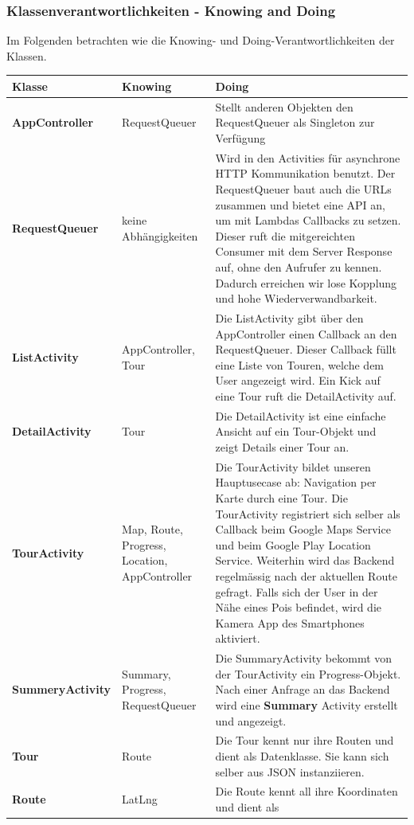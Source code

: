 \documentclass[a4paper,10pt,xetex]{article}
\begin{document}
\subsubsection{Klassenverantwortlichkeiten - Knowing and Doing}\label{knowinganddoing-frontend}
Im Folgenden betrachten wie die Knowing- und Doing-Verantwortlichkeiten der Klassen. 
\begin{longtabu} to \textwidth { | l | l | X[l] |  }
\hline
\textbf{Klasse} & \textbf{Knowing} & \textbf{Doing} \\\hline
\endhead
\textbf{AppController} & RequestQueuer & Stellt anderen Objekten den RequestQueuer 
als Singleton zur Verfügung\\\hline
\textbf{RequestQueuer} & keine Abhängigkeiten & Wird in den Activities für asynchrone
HTTP Kommunikation benutzt. Der RequestQueuer baut auch die URLs zusammen und bietet
eine API an, um mit Lambdas Callbacks zu setzen. Dieser ruft die mitgereichten 
Consumer mit dem Server Response auf, ohne den Aufrufer zu kennen. Dadurch erreichen
wir lose Kopplung und hohe Wiederverwandbarkeit. \\\hline
\textbf{ListActivity} & AppController, Tour & Die ListActivity gibt über den AppController
einen Callback an den RequestQueuer. Dieser Callback füllt eine Liste von Touren,
welche dem User angezeigt wird. Ein Kick auf eine Tour ruft die DetailActivity auf.
\\\hline
\textbf{DetailActivity} & Tour & Die DetailActivity ist eine einfache Ansicht auf 
ein Tour-Objekt und zeigt Details einer Tour an.\\\hline
\textbf{TourActivity} & Map, Route, Progress, Location, AppController & Die TourActivity bildet
unseren Hauptusecase ab: Navigation per Karte durch eine Tour. Die TourActivity
registriert sich selber als Callback beim Google Maps Service und beim Google
Play Location Service. Weiterhin wird das Backend regelmässig nach der aktuellen
Route gefragt. Falls sich der User in der Nähe eines Pois befindet, wird die 
Kamera App des Smartphones aktiviert.\\\hline
\textbf{SummeryActivity} & Summary, Progress, RequestQueuer & Die SummaryActivity 
bekommt von der TourActivity ein Progress-Objekt. Nach einer Anfrage an das 
Backend wird eine \textbf{Summary} Activity erstellt und angezeigt.\\\hline
\textbf{Tour} & Route & Die Tour kennt nur ihre Routen und dient als Datenklasse. 
Sie kann sich selber aus JSON instanziieren.\\\hline
\textbf{Route} & LatLng & Die Route kennt all ihre Koordinaten und dient als 

\end{longtabu}
\end{document}
